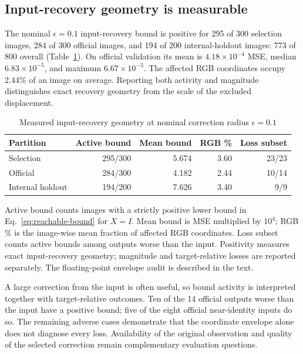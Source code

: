 \documentclass[12pt]{article}
\newcommand{\tabnote}[1]{\par\vspace{5pt}\noindent #1}
\begin{document}
\subsection{Input-recovery geometry is measurable}
The nominal $\epsilon=0.1$ input-recovery bound is positive for 295 of 300 selection images, 284 of 300 official images, and 194 of 200 internal-holdout images: 773 of 800 overall (Table~\ref{tab:reachability}). On official validation its mean is $4.18\times10^{-4}$ MSE, median $6.83\times10^{-5}$, and maximum $6.67\times10^{-3}$. The affected RGB coordinates occupy 2.44\% of an image on average. Reporting both activity and magnitude distinguishes exact recovery geometry from the scale of the excluded displacement.
\begin{table}[t]
\caption{Measured input-recovery geometry at nominal correction radius $\epsilon=0.1$}
\label{tab:reachability}
\begin{tabularx}{\linewidth}{@{}Xrrrr@{}}
\toprule
Partition & Active bound & Mean bound & RGB \% & Loss subset\\
\midrule
Selection & 295/300 & 5.674 & 3.60 & 23/23 \\
Official & 284/300 & 4.182 & 2.44 & 10/14 \\
Internal holdout & 194/200 & 7.626 & 3.40 & 9/9 \\
\bottomrule
\end{tabularx}
\tabnote{Active bound counts images with a strictly positive lower bound in Eq.~\eqref{eq:reachable-bound} for $X=I$. Mean bound is MSE multiplied by $10^4$; RGB \% is the image-wise mean fraction of affected RGB coordinates. Loss subset counts active bounds among outputs worse than the input. Positivity measures exact input-recovery geometry; magnitude and target-relative losses are reported separately. The floating-point envelope audit is described in the text.}
\end{table}


A large correction from the input is often useful, so bound activity is interpreted together with target-relative outcomes. Ten of the 14 official outputs worse than the input have a positive bound; five of the eight official near-identity inputs do so. The remaining adverse cases demonstrate that the coordinate envelope alone does not diagnose every loss. Availability of the original observation and quality of the selected correction remain complementary evaluation questions.
\end{document}
